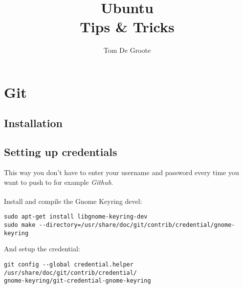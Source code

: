 \documentclass[a4paper]{article}
\title{Ubuntu \\
		Tips \& Tricks}
\author{Tom De Groote}
\begin{document}
\maketitle
\tableofcontents
\pagebreak


\section{Git}
\subsection{Installation}

\subsection{Setting up credentials}
This way you don't have to enter your username and password every time you want to push to for example \emph{Github}.
\\\\
Install and compile the Gnome Keyring devel:
\begin{lstlisting}
sudo apt-get install libgnome-keyring-dev
sudo make --directory=/usr/share/doc/git/contrib/credential/gnome-keyring
\end{lstlisting}

\noindent And setup the credential:
\begin{lstlisting}
git config --global credential.helper /usr/share/doc/git/contrib/credential/
gnome-keyring/git-credential-gnome-keyring
\end{lstlisting}
\end{document}
